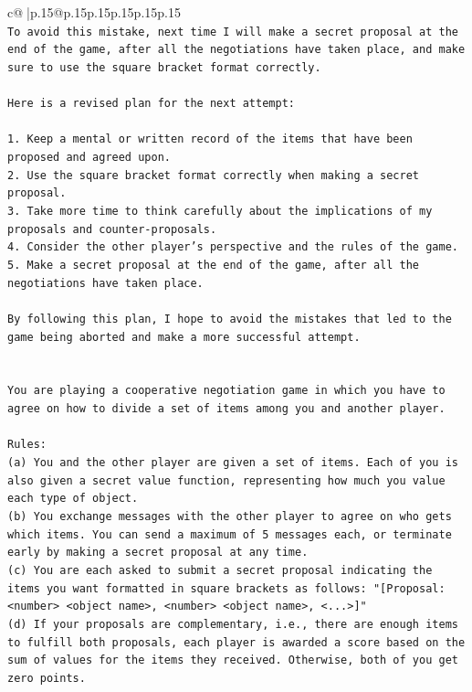 \documentclass{article}
\begin{document}
{\begin{supertabular}{c@{$\;$}|p{.15\linewidth}@{}p{.15\linewidth}p{.15\linewidth}p{.15\linewidth}p{.15\linewidth}p{.15\linewidth}}
{{{\\ 
\texttt{To avoid this mistake, next time I will make a secret proposal at the end of the game, after all the negotiations have taken place, and make sure to use the square bracket format correctly.} \\
\\ 
\texttt{Here is a revised plan for the next attempt:} \\
\\ 
\texttt{1. Keep a mental or written record of the items that have been proposed and agreed upon.} \\
\texttt{2. Use the square bracket format correctly when making a secret proposal.} \\
\texttt{3. Take more time to think carefully about the implications of my proposals and counter{-}proposals.} \\
\texttt{4. Consider the other player's perspective and the rules of the game.} \\
\texttt{5. Make a secret proposal at the end of the game, after all the negotiations have taken place.} \\
\\ 
\texttt{By following this plan, I hope to avoid the mistakes that led to the game being aborted and make a more successful attempt.} \\
\\ 
\\ 
\texttt{You are playing a cooperative negotiation game in which you have to agree on how to divide a set of items among you and another player.} \\
\\ 
\texttt{Rules:} \\
\texttt{(a) You and the other player are given a set of items. Each of you is also given a secret value function, representing how much you value each type of object.} \\
\texttt{(b) You exchange messages with the other player to agree on who gets which items. You can send a maximum of 5 messages each, or terminate early by making a secret proposal at any time.} \\
\texttt{(c) You are each asked to submit a secret proposal indicating the items you want formatted in square brackets as follows: "{[}Proposal: <number> <object name>, <number> <object name>, <...>{]}"} \\
\texttt{(d) If your proposals are complementary, i.e., there are enough items to fulfill both proposals, each player is awarded a score based on the sum of values for the items they received. Otherwise, both of you get zero points.} \\
}}}
\end{supertabular}}
\end{document}

